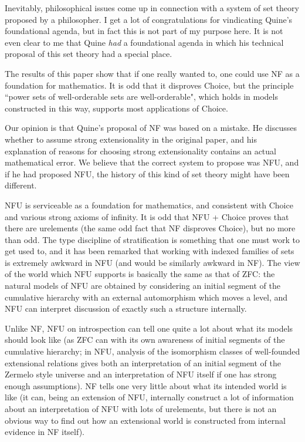 \documentclass[112pt]{article}
\begin{document}
Inevitably, philosophical issues come up in connection with a system of set theory proposed by a philosopher.  I get a lot of congratulations for vindicating Quine's foundational agenda, but in fact this is not part of my purpose here.  It is not even clear to me that Quine {\em had\/} a foundational agenda in which his technical proposal of this set theory had a special place.

The results of this paper show that if one really wanted to, one could use NF as a foundation for mathematics.  It is odd that it disproves Choice, but the principle ``power sets of well-orderable sets are well-orderable", which holds in models constructed in this way, supports most applications of Choice.

Our opinion is that Quine's proposal of NF was based on a mistake.  He discusses whether to assume strong extensionality in the original paper, and his explanation of reasons for choosing strong extensionality contains an actual mathematical error.  We believe that the correct system to propose was NFU, and if he had proposed NFU, the history of this kind of set theory might have been different.

NFU is serviceable as a foundation for mathematics, and consistent with Choice and various strong axioms of infinity.  It is odd that NFU + Choice proves that there are urelements (the same odd fact that NF disproves Choice), but no more than odd.
The type discipline of stratification is something that one must work to get used to, and it has been remarked that working with indexed families of sets is extremely awkward in NFU (and would be similarly awkward in NF).  The view of the world which NFU supports is basically the same as that of ZFC:  the natural models of NFU are obtained by considering an initial segment of the cumulative hierarchy with an external automorphism which moves a level, and NFU can interpret discussion of exactly such a structure internally.

Unlike NF, NFU on introspection can tell one quite a lot about what its models should look like (as ZFC can with its own awareness of initial segments of the cumulative hierarchy; in NFU, analysis of the isomorphism classes of well-founded extensional relations gives both an interpretation of an initial segment of the Zermelo style universe and an interpretation of NFU itself if one has strong enough assumptions).    NF tells one very little about what its intended world is like (it can, being an extension of NFU, internally construct a lot of information about an interpretation of NFU with lots of urelements, but there is not an obvious way to find out how an extensional world is constructed from internal evidence in NF itself).
\end{document}
